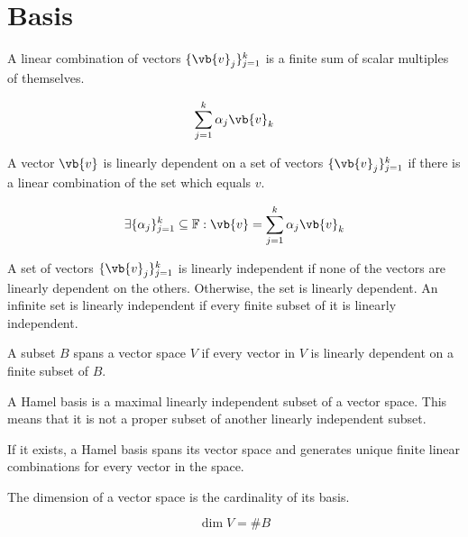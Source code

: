 \section{Basis}

\begin{definition}
	A linear combination of vectors $\{ \vb{v}_{j} \}_{j = 1}^{k}$ is a finite sum of scalar multiples of themselves.
	
	\begin{equation}
		\sum_{j = 1}^{k} \alpha_{j} \vb{v}_{k}
	\end{equation}
\end{definition}

\begin{definition}
	A vector $\vb{v}$ is linearly dependent on a set of vectors $\{ \vb{v}_{j} \}_{j = 1}^{k}$ if there is a linear combination of the set which equals $v$.
	
	\begin{equation}
		\exists \{ \alpha_{j} \}_{j = 1}^{k} \subseteq \mathbb{F}: \vb{v} = \sum_{j = 1}^{k} \alpha_{j} \vb{v}_{k}
	\end{equation}
\end{definition}

\begin{definition}
	A set of vectors $\{ \vb{v}_{j} \}_{j = 1}^{k}$ is linearly independent if none of the vectors are linearly dependent on the others. Otherwise, the set is linearly dependent. An infinite set is linearly independent if every finite subset of it is linearly independent.
\end{definition}

\begin{definition}[Span]
A subset $B$ spans a vector space $V$ if every vector in $V$ is linearly dependent on a finite subset of $B$.
\end{definition}

\begin{definition}
	A Hamel basis is a maximal linearly independent subset of a vector space. This means that it is not a proper subset of another linearly independent subset.
\end{definition}

If it exists, a Hamel basis spans its vector space and generates unique finite linear combinations for every vector in the space.

\begin{definition}[Dimension]
	The dimension of a vector space is the cardinality of its basis.
	
	\begin{equation}
		\dim{V} = \# B
	\end{equation}
\end{definition}

